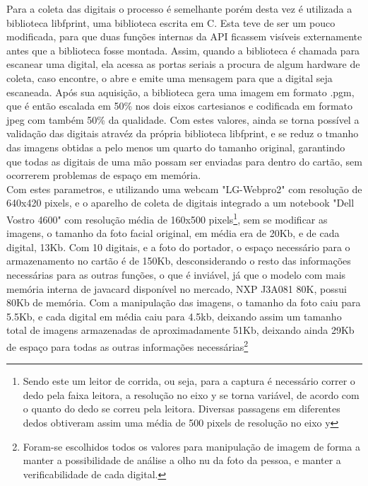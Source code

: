 \documentclass{article}
\begin{document}
\begin{justify}
		\hspace*{2cm}Para a coleta das digitais o processo é semelhante porém desta vez é utilizada a biblioteca libfprint, uma biblioteca escrita em C. Esta teve de ser um pouco modificada, para que duas funções internas da API ficassem visíveis externamente antes que a biblioteca fosse montada. Assim, quando a biblioteca é chamada para escanear uma digital, ela acessa as portas seriais a procura de algum hardware de coleta, caso encontre, o abre e emite uma mensagem para que a digital seja escaneada. Após sua aquisição, a biblioteca gera uma imagem em formato .pgm, que é então escalada em 50\% nos dois eixos cartesianos e codificada em formato jpeg com também 50\% da qualidade. Com estes valores, ainda se torna possível a validação das digitais atravéz da própria biblioteca libfprint, e se reduz o tmanho das imagens obtidas a pelo menos um quarto do tamanho original, garantindo que todas as digitais de uma mão possam ser enviadas para dentro do cartão, sem ocorrerem problemas de espaço em memória.\\
		\hspace*{2cm}Com estes parametros, e utilizando uma webcam "LG-Webpro2" com resolução de 640x420 pixels, e o aparelho de coleta de digitais integrado a um notebook "Dell Vostro 4600" com resolução média de 160x500 pixels\footnote{Sendo este um leitor de corrida, ou seja, para a captura é necessário correr o dedo pela faixa leitora, a resolução no eixo y se torna variável, de acordo com o quanto do dedo se correu pela leitora. Diversas passagens em diferentes dedos obtiveram assim uma média de 500 pixels de resolução no eixo y}, sem se modificar as imagens, o tamanho da foto facial original, em média era de 20Kb, e de cada digital, 13Kb. Com 10 digitais, e a foto do portador, o espaço necessário para o armazenamento no cartão é de 150Kb, desconsiderando o resto das informações necessárias para as outras funções, o que é inviável, já que o modelo com mais memória interna de javacard disponível no mercado, NXP J3A081 80K, possui 80Kb de memória. Com a manipulação das imagens, o tamanho da foto caiu para 5.5Kb, e cada digital em média caiu para 4.5kb, deixando assim um tamanho total de imagens armazenadas de aproximadamente 51Kb, deixando ainda 29Kb de espaço para todas as outras informações necessárias\footnote{Foram-se escolhidos todos os valores para manipulação de imagem de forma a manter a possibilidade de análise a olho nu da foto da pessoa, e manter a verificabilidade de cada digital.}\\

\end{justify}
\end{document}
